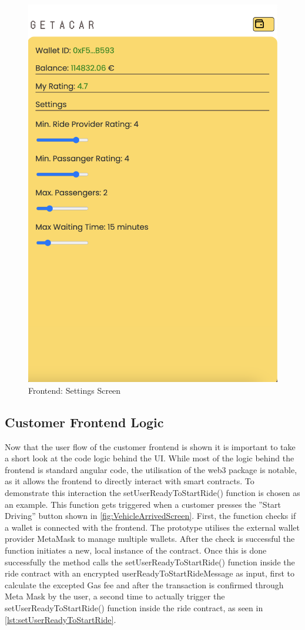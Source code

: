 \begin{figure}[H]
    \centering
    \includegraphics[width=0.45\linewidth]{data/ffss/13.png}
    \caption{Frontend: Settings Screen}
    \label{fig:SettingsScreen}
\end{figure}


\subsection{Customer Frontend Logic}
Now that the user flow of the customer frontend is shown it is important to take a short look at the code logic behind the UI. While most of the logic behind the frontend is standard angular code, the utilisation of the web3 package is notable, as it allows the frontend to directly interact with smart contracts. To demonstrate this interaction the setUserReadyToStartRide() function is chosen as an example. This function gets triggered when a customer presses the ''Start Driving'' button shown in \ref{fig:VehicleArrivedScreen}. First, the function checks if a wallet is connected with the frontend. The prototype utilises the external wallet provider MetaMask to manage multiple wallets. After the check is successful the function initiates a new, local instance of the contract. Once this is done successfully the method calls the setUserReadyToStartRide() function inside the ride contract with an encrypted userReadyToStartRideMessage as input, first to calculate the excepted Gas fee and after the transaction is confirmed through Meta Mask by the user, a second time to actually trigger the setUserReadyToStartRide() function inside the ride contract, as seen in \ref{lst:setUserReadyToStartRide}.

